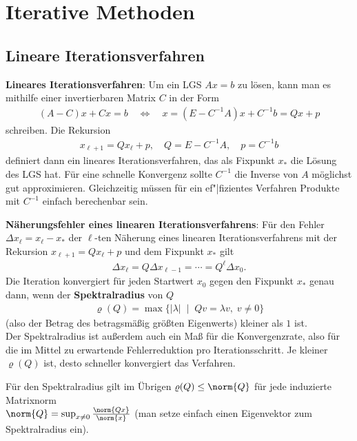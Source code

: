 \chapter{%
    Iterative Methoden%
}

\section{%
    Lineare Iterationsverfahren%
}

\textbf{Lineares Iterationsverfahren}:
Um ein LGS $Ax = b$ zu lösen, kann man es mithilfe einer
invertierbaren Matrix $C$ in der Form
\begin{align*}
    (A - C)x + Cx = b
    \quad\Leftrightarrow\quad
    x = (E - C^{-1}A)x + C^{-1}b = Qx + p
\end{align*}
schreiben.
Die Rekursion
\begin{align*}
    x_{\ell+1} = Qx_\ell + p, \quad
    Q = E - C^{-1}A, \quad
    p = C^{-1}b
\end{align*}
definiert dann ein lineares Iterationsverfahren, das als Fixpunkt $x_\ast$
die Lösung des LGS hat.
Für eine schnelle Konvergenz sollte $C^{-1}$ die Inverse von $A$ möglichst
gut approximieren.
Gleichzeitig müssen für ein ef"|fizientes Verfahren Produkte mit $C^{-1}$
einfach berechenbar sein.

\linie

\textbf{Näherungsfehler eines linearen Iterationsverfahrens}:
Für den Fehler $\Delta x_\ell = x_\ell - x_\ast$ der $\ell$-ten Näherung
eines linearen Iterationsverfahrens mit der Rekursion
$x_{\ell+1} = Qx_\ell + p$ und dem Fixpunkt $x_\ast$ gilt
\begin{align*}
    \Delta x_\ell
    = Q \Delta x_{\ell-1}
    = \dotsb
    = Q^\ell \Delta x_0.
\end{align*}
Die Iteration konvergiert für jeden Startwert $x_0$ gegen den Fixpunkt
$x_\ast$ genau dann, wenn der \textbf{Spektralradius} von $Q$
\begin{align*}
    \varrho(Q) = \max\{|\lambda| \;\;|\;\; Qv = \lambda v,\; v \not= 0\}
\end{align*}
(also der Betrag des betragsmäßig größten Eigenwerts) kleiner als $1$ ist. \\
Der Spektralradius ist außerdem auch ein Maß für die Konvergenzrate, also für
die im Mittel zu erwartende Fehlerreduktion pro Iterationsschritt.
Je kleiner $\varrho(Q)$ ist, desto schneller konvergiert das Verfahren.

Für den Spektralradius gilt im Übrigen $\varrho(Q) \le \norm{Q}$ für jede
induzierte Matrixnorm \\
$\norm{Q} = \sup_{x \not= 0} \frac{\norm{Qx}}{\norm{x}}$
(man setze einfach einen Eigenvektor zum Spektralradius ein).

